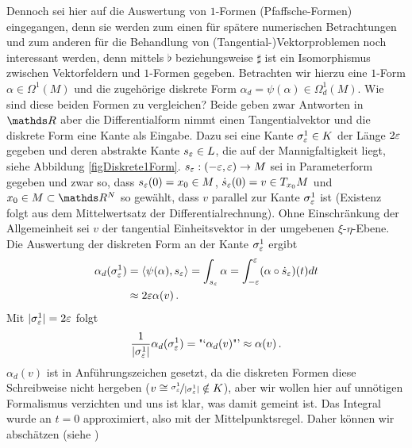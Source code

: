\begin{bemerkung}
    Dennoch sei hier auf die Auswertung von \( 1 \)-Formen (Pfaffsche-Formen) eingegangen, 
    denn sie werden zum einen für spätere numerischen Betrachtungen und zum anderen für die Behandlung von (Tangential-)Vektorproblemen
    noch interessant werden, denn mittels \( \flat \) beziehungsweise \( \sharp \) ist ein Isomorphismus zwischen Vektorfeldern und \( 1 \)-Formen gegeben.
    Betrachten wir hierzu eine \( 1 \)-Form \( \alpha\in\Omega^{1}(M) \) und die zugehörige diskrete Form \( \alpha_{d} = \psi(\alpha)\in\Omega^{1}_{d}(M) \).
    Wie sind diese beiden Formen zu vergleichen? 
    Beide geben zwar Antworten in \( \R \) aber die Differentialform nimmt einen Tangentialvektor und die diskrete Form eine Kante als Eingabe. 
    Dazu sei eine Kante \( \sigma^{1}_{\varepsilon} \in K\) der Länge \( 2\varepsilon \) gegeben und deren abstrakte Kante \( s_{\varepsilon}\in L \), die auf der Mannigfaltigkeit liegt, 
    siehe Abbildung \ref{figDiskrete1Form}.
    \( s_{\varepsilon}: (-\varepsilon,\varepsilon)\rightarrow M \) sei in Parameterform gegeben und zwar so, dass \( s_{\varepsilon}(0)=x_{0}\in M \), \( \dot{s}_{\varepsilon}(0) = v \in T_{x_{0}}M \) 
    und \( x_{0}\in M \subset \R^{N} \) so gewählt, dass \( v \) parallel zur Kante \( \sigma^{1}_{\varepsilon} \) ist (Existenz folgt aus dem Mittelwertsatz der Differentialrechnung).
    Ohne Einschränkung der Allgemeinheit sei \( v \) der tangential Einheitsvektor in der umgebenen \( \xi \)-\( \eta \)-Ebene.
    Die Auswertung der diskreten Form an der Kante \( \sigma^{1}_{\varepsilon} \) ergibt
    \begin{align}
        \alpha_{d}(\sigma_{\varepsilon}^{1}) &= \langle \psi(\alpha) , s_{\varepsilon} \rangle = \int_{s_{\varepsilon}}\alpha = \int_{-\varepsilon}^{\varepsilon} (\alpha \circ \dot{s}_{\varepsilon})(t) dt\\
                                 &\approx 2\varepsilon \alpha(v) \,\text{.}
    \end{align}
    Mit \( |\sigma^{1}_{\varepsilon}| = 2\varepsilon \) folgt 
    \begin{align}
    \label{eqApprox1Form}
      \frac{1}{|\sigma^{1}_{\varepsilon}|} \alpha_{d}(\sigma_{\varepsilon}^{1}) = \text{"`}\alpha_{d}(v)\text{"'} \approx \alpha(v)\,\text{.}
    \end{align}
    \( \alpha_{d}(v) \) ist in Anführungszeichen gesetzt, da die diskreten Formen diese Schreibweise nicht hergeben (\( v \cong \nicefrac{\sigma^{1}_{\varepsilon}}{|\sigma^{1}_{\varepsilon}|} \notin K \)), 
    aber wir wollen hier auf unnötigen Formalismus verzichten und uns ist
    klar, was damit gemeint ist.
    Das Integral wurde an \( t=0 \) approximiert, also mit der Mittelpunktsregel.
    Daher können wir abschätzen (siehe \cite[Kap. 7]{einfNum})

\end{bemerkung}
